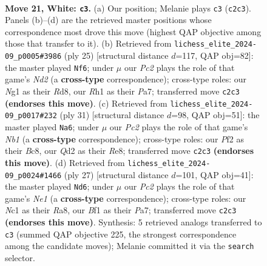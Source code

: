 \documentclass[11pt]{article}
\begin{document}
\clearpage

\begin{figure}[p]\centering
\begin{subfigure}{0.46\textwidth}\centering
\resizebox{\linewidth}{!}{%
\newchessgame
\chessboard[
  setfen={rnb1rk2/3nq2p/pp2p1p1/2p1P3/P2p4/8/1PPQ1PPP/1KN1RBNR w - - 4 21},
  showmover=false,
  pgfstyle=straightmove, color=movearrow, markmove={c2-c3}
]}
\caption{}
\end{subfigure}\hfill
\begin{subfigure}{0.46\textwidth}\centering
\resizebox{\linewidth}{!}{%
\newchessgame
\chessboard[
  setfen={r1br2k1/pp1n1pbp/2pq2p1/5p2/3P4/1PN1P1P1/P3NPBP/2RQ1RK1 b - - 4 13},
  showmover=false,
  pgfstyle=straightmove, color=movearrow, markmove={d7-f6}
]}
\caption{}
\end{subfigure}
\\[4pt]
\begin{subfigure}{0.46\textwidth}\centering
\resizebox{\linewidth}{!}{%
\newchessgame
\chessboard[
  setfen={rnb1r1k1/1p2P1bp/2pq2p1/8/p1Pp4/P2P1NP1/1P2QPBP/RN2R1K1 b - - 1 16},
  showmover=false,
  pgfstyle=straightmove, color=movearrow, markmove={b8-a6}
]}
\caption{}
\end{subfigure}\hfill
\begin{subfigure}{0.46\textwidth}\centering
\resizebox{\linewidth}{!}{%
\newchessgame
\chessboard[
  setfen={r2rn1k1/pp1qppbp/n1p3p1/8/P1NPP3/4BP2/1P2N1PP/R2QR1K1 b - - 4 14},
  showmover=false,
  pgfstyle=straightmove, color=movearrow, markmove={e8-d6}
]}
\caption{}
\end{subfigure}
\caption{\textbf{Move 21, White: \texttt{c3}.} (a) Our position; Melanie plays \texttt{c3} (\texttt{c2c3}). Panels (b)--(d) are the retrieved master positions whose correspondence most drove this move (highest QAP objective among those that transfer to it). (b) Retrieved from \texttt{lichess\_elite\_2024-09\_p0005\#3986} (ply 25) [structural distance $d$=117, QAP obj=82]: the master played \texttt{Nf6}; under $\mu$ our \emph{Pc2} plays the role of that game's \emph{Nd2} (a \textbf{cross-type} correspondence); cross-type roles: our \emph{N}g1 as their \emph{R}d8, our \emph{R}h1 as their \emph{P}a7; transferred move \texttt{c2c3} \textbf{(endorses this move)}. (c) Retrieved from \texttt{lichess\_elite\_2024-09\_p0017\#232} (ply 31) [structural distance $d$=98, QAP obj=51]: the master played \texttt{Na6}; under $\mu$ our \emph{Pc2} plays the role of that game's \emph{Nb1} (a \textbf{cross-type} correspondence); cross-type roles: our \emph{P}f2 as their \emph{B}c8, our \emph{Q}d2 as their \emph{R}e8; transferred move \texttt{c2c3} \textbf{(endorses this move)}. (d) Retrieved from \texttt{lichess\_elite\_2024-09\_p0024\#1466} (ply 27) [structural distance $d$=101, QAP obj=41]: the master played \texttt{Nd6}; under $\mu$ our \emph{Pc2} plays the role of that game's \emph{Ne1} (a \textbf{cross-type} correspondence); cross-type roles: our \emph{N}c1 as their \emph{R}a8, our \emph{B}f1 as their \emph{P}a7; transferred move \texttt{c2c3} \textbf{(endorses this move)}. Synthesis: 5 retrieved analogs transferred to \texttt{c3} (summed QAP objective 225, the strongest correspondence among the candidate moves); Melanie committed it via the \texttt{search} selector.}

\end{figure}
\end{document}
